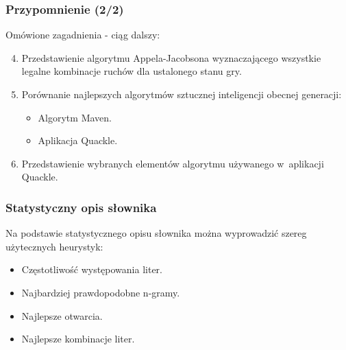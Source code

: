 \documentclass[10pt,a4paper]{beamer}
\begin{document}
\begin{frame}
	\frametitle{Przypomnienie (2/2)}

	Omówione zagadnienia - ciąg dalszy:

	\begin{enumerate}
		\setcounter{enumi}{3}
		\item Przedstawienie algorytmu Appela-Jacobsona wyznaczającego wszystkie legalne kombinacje ruchów dla ustalonego stanu gry.
		\item Porównanie najlepszych algorytmów sztucznej inteligencji obecnej generacji:
			\begin{itemize}
				\item Algorytm Maven.
				\item Aplikacja Quackle.
			\end{itemize}
		\item Przedstawienie wybranych elementów algorytmu używanego w~aplikacji Quackle.
	\end{enumerate}
\end{frame}

\begin{frame}
	\frametitle{Statystyczny opis słownika}
	
	Na podstawie statystycznego opisu słownika można wyprowadzić szereg użytecznych heurystyk:
	
	\begin{itemize}
		\item Częstotliwość występowania liter.
		\item Najbardziej prawdopodobne n-gramy.
		\item Najlepsze otwarcia.
		\item Najlepsze kombinacje liter.
	\end{itemize}
\end{frame}
\end{document}
